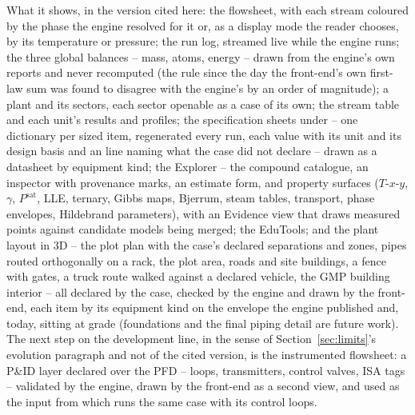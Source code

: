 \documentclass[11pt,a4paper]{article}
\newcommand{\code}[1]{\texttt{\detokenize{#1}}}
\begin{document}
What it shows, in the version cited here: the flowsheet, with each stream
coloured by the phase the engine resolved for it or, as a display mode the
reader chooses, by its temperature or pressure; the run log, streamed
live while the engine runs; the three global balances -- mass, atoms,
energy -- drawn from the engine's own reports and never recomputed (the
rule since the day the front-end's own first-law sum was found to disagree
with the engine's by an order of magnitude); a plant and its sectors, each
sector openable as a case of its own; the stream table and each unit's
results and profiles; the specification sheets under \code{design/} -- one
dictionary per sized item, regenerated every run, each value with its unit
and its design basis and an \code{assumed} line naming what the case did
not declare -- drawn as a datasheet by equipment kind; the Explorer -- the
compound catalogue, an inspector with provenance marks, an estimate form,
and property surfaces ($T$-$x$-$y$, $\gamma$, $P^\mathrm{sat}$, LLE, ternary,
Gibbs maps, Bjerrum, steam tables, transport, phase envelopes, Hildebrand
parameters), with an Evidence view that draws measured points against
candidate models being merged; the EduTools; and the plant layout in 3D --
the plot plan with the case's declared separations and zones, pipes routed
orthogonally on a rack, the plot area, roads and site buildings, a fence
with gates, a truck route walked against a declared vehicle, the GMP
building interior -- all declared by the case, checked by the engine and
drawn by the front-end, each item by its equipment kind on the envelope
the engine published and, today, sitting at grade (foundations and the
final piping detail are future work).  The next step on the development line, in
the sense of Section~\ref{sec:limits}'s evolution paragraph and not of the
cited version, is the instrumented flowsheet: a P\&ID layer declared over
the PFD -- loops, transmitters, control valves, ISA tags -- validated by
the engine, drawn by the front-end as a second view, and used as the input
from which \code{choupoCtrl} runs the same case with its control loops.
\end{document}
